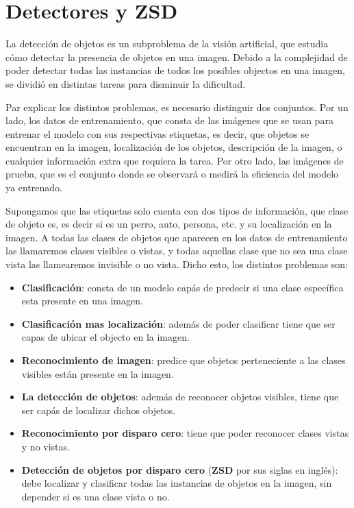 \section{Detectores y ZSD} \label{sec:detectoresyzsd}
La detección de objetos es un subproblema de la visión artificial, que estudia cómo detectar la presencia de objetos en una imagen. Debido a la complejidad de poder detectar todas las instancias de todos los posibles objectos en una imagen, se dividió en distintas tareas para disminuir la dificultad. 

Par explicar los distintos problemas, es necesario distinguir dos conjuntos. Por un lado, los datos de entrenamiento, que consta de las imágenes que se usan para entrenar el modelo con sus respectivas etiquetas, es decir, que objetos se encuentran en la imagen, localización de los objetos, descripción de la imagen, o cualquier información extra que requiera la tarea. Por otro lado, las imágenes de prueba, que es el conjunto donde se observará o medirá la eficiencia del modelo ya entrenado. 

Supongamos que las etiquetas solo cuenta con dos tipos de información, que clase de objeto es, es decir si es un perro, auto, persona, etc. y su localización en la imagen. A todas las clases de objetos que aparecen en los datos de entrenamiento las llamaremos clases visibles o vistas, y todas aquellas clase que no sea una clase vista las llamearemos invisible o no vista. Dicho esto, los distintos problemas son:

\begin{itemize}
	\item \textbf{Clasificación}: consta de un modelo capás de predecir si una clase específica esta presente en una imagen. 
	\item \textbf{Clasificación mas localización}: además de poder clasificar tiene que ser capas de ubicar el objecto en la imagen.
	\item \textbf{Reconocimiento de imagen}: predice que objetos perteneciente a las clases visibles están presente en la imagen. 
	\item \textbf{La detección de objetos}: además de reconocer objetos visibles, tiene que ser capás de localizar dichos objetos. 
	\item \textbf{Reconocimiento por disparo cero}: tiene que poder reconocer clases vistas y no vistas.
	\item \textbf{Detección de objetos por disparo cero} (\textbf{ZSD} por sus siglas en inglés): debe localizar y clasificar todas las instancias de objetos en la imagen, sin depender si es una clase vista o no.
\end{itemize}

